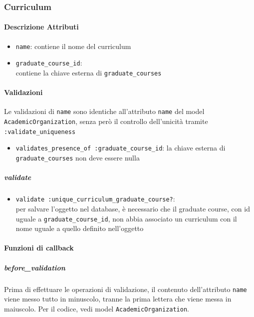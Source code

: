 \documentclass[11pt,a4paper]{article}
\begin{document}
\subsubsection{Curriculum}
\paragraph{Descrizione Attributi}
\begin{itemize}
 \item \verb|name|: contiene il nome del curriculum
 \item \verb|graduate_course_id|:\\ contiene la chiave esterna di \verb|graduate_courses|	 
\end{itemize}
\paragraph{Validazioni}
Le validazioni di \verb|name| sono identiche all'attributo \verb|name| del model \verb|AcademicOrganization|, senza però il controllo dell'unicità tramite \verb|:validate_uniqueness|
\begin{itemize}
 \item \verb|validates_presence_of :graduate_course_id|: la chiave esterna di \verb|graduate_courses| non deve essere nulla
\end{itemize}
\subparagraph{validate}
\begin{itemize}
 \item \verb|validate :unique_curriculum_graduate_course?|: \\per salvare l'oggetto nel database, è necessario che il graduate course, con id uguale a \verb|graduate_course_id|, non abbia associato un curriculum con il nome uguale a quello definito nell'oggetto
\end{itemize}

\paragraph{Funzioni di callback}
\subparagraph{before\_validation}
Prima di effettuare le operazioni di validazione, il contenuto dell'attributo \verb|name| viene messo tutto in minuscolo, tranne la prima lettera che viene messa in maiuscolo. Per il codice, vedi model \verb|AcademicOrganization|.
\end{document}
